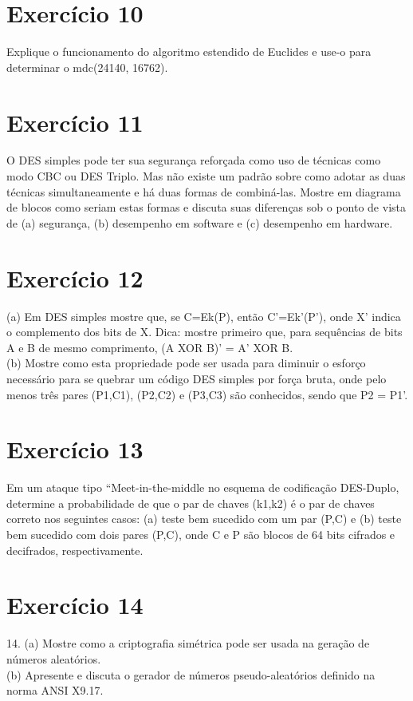 \documentclass[10pt,a4paper]{article}
\begin{document}
\section*{Exercício 10}
Explique o funcionamento do algoritmo estendido de Euclides e use-o para determinar o mdc(24140, 16762).\\
\section*{Exercício 11}
O DES simples pode ter sua segurança reforçada como uso de técnicas como modo CBC ou DES Triplo. Mas não existe um padrão sobre como adotar as duas técnicas simultaneamente e há duas formas de combiná-las. Mostre em diagrama de blocos como seriam estas formas e discuta suas diferenças sob o ponto de vista de (a) segurança, (b) desempenho em software e (c) desempenho em hardware.\\
\section*{Exercício 12}
(a) Em DES simples mostre que, se C=Ek(P), então C'=Ek'(P'), onde X' indica o complemento dos bits de X. Dica: mostre primeiro que, para sequências de bits A e B de mesmo comprimento, (A XOR B)' = A' XOR B.\\
(b) Mostre como esta propriedade pode ser usada para diminuir o esforço necessário para se quebrar um código DES simples por força bruta, onde pelo menos três pares (P1,C1), (P2,C2) e (P3,C3) são conhecidos, sendo que P2 = P1'.\\
\section*{Exercício 13}
Em um ataque tipo ``Meet-in-the-middle no esquema de codificação DES-Duplo, determine a probabilidade de que o par de chaves (k1,k2) é o par de chaves correto nos seguintes casos: (a) teste bem sucedido com um par (P,C) e (b) teste bem sucedido com dois pares (P,C), onde C e P são blocos de 64 bits cifrados e decifrados, respectivamente.\\
\section*{Exercício 14}
14. (a) Mostre como a criptografia simétrica pode ser usada na geração de números aleatórios.\\
(b) Apresente e discuta o gerador de números pseudo-aleatórios definido na norma ANSI X9.17.\\
\end{document}
